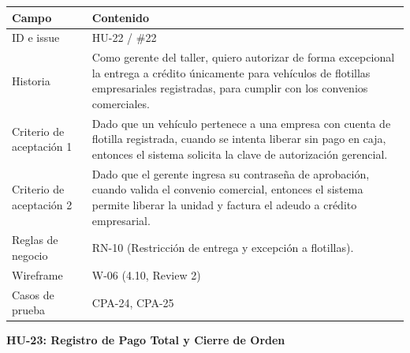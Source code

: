 {\def\LTcaptype{none} %
\begin{longtable}[]{@{}
  >{\raggedright\arraybackslash}p{}
  >{\raggedright\arraybackslash}p{}@{}}
\toprule\noalign{}
\begin{minipage}[b]{\linewidth}\raggedright
\textbf{Campo}
\end{minipage} & \begin{minipage}[b]{\linewidth}\raggedright
\textbf{Contenido}
\end{minipage} \\
\midrule\noalign{}
\endhead
\bottomrule\noalign{}
\endlastfoot
ID e issue & HU-22 / \#22 \\
Historia & Como gerente del taller, quiero autorizar de forma
excepcional la entrega a crédito únicamente para vehículos de flotillas
empresariales registradas, para cumplir con los convenios
comerciales. \\
Criterio de aceptación 1 & Dado que un vehículo pertenece a una empresa
con cuenta de flotilla registrada, cuando se intenta liberar sin pago en
caja, entonces el sistema solicita la clave de autorización
gerencial. \\
Criterio de aceptación 2 & Dado que el gerente ingresa su contraseña de
aprobación, cuando valida el convenio comercial, entonces el sistema
permite liberar la unidad y factura el adeudo a crédito empresarial. \\
Reglas de negocio & RN-10 (Restricción de entrega y excepción a
flotillas). \\
Wireframe & W-06 (4.10, Review 2) \\
Casos de prueba & CPA-24, CPA-25 \\
\end{longtable}
}

\textbf{HU-23: Registro de Pago Total y Cierre de Orden}

